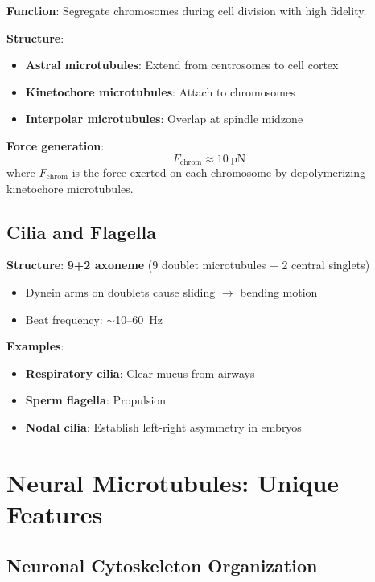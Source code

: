 \textbf{Function}: Segregate chromosomes during cell division with high fidelity.

\textbf{Structure}:
\begin{itemize}
\item \textbf{Astral microtubules}: Extend from centrosomes to cell cortex
\item \textbf{Kinetochore microtubules}: Attach to chromosomes
\item \textbf{Interpolar microtubules}: Overlap at spindle midzone
\end{itemize}

\textbf{Force generation}:
\begin{equation}
F_{\mathrm{chrom}} \approx 10~\mathrm{pN}
\end{equation}
where $F_{\mathrm{chrom}}$ is the force exerted on each chromosome by depolymerizing kinetochore microtubules.

\subsection{Cilia and Flagella}
\label{subsec:cilia-flagella}

\textbf{Structure}: \textbf{9+2 axoneme} (9 doublet microtubules + 2 central singlets)
\begin{itemize}
\item Dynein arms on doublets cause sliding $\rightarrow$ bending motion
\item Beat frequency: $\sim$10--60~Hz
\end{itemize}

\textbf{Examples}:
\begin{itemize}
\item \textbf{Respiratory cilia}: Clear mucus from airways
\item \textbf{Sperm flagella}: Propulsion
\item \textbf{Nodal cilia}: Establish left-right asymmetry in embryos
\end{itemize}


\section{Neural Microtubules: Unique Features}
\label{sec:neural-microtubules}

\subsection{Neuronal Cytoskeleton Organization}
\label{subsec:neuronal-cytoskeleton}

